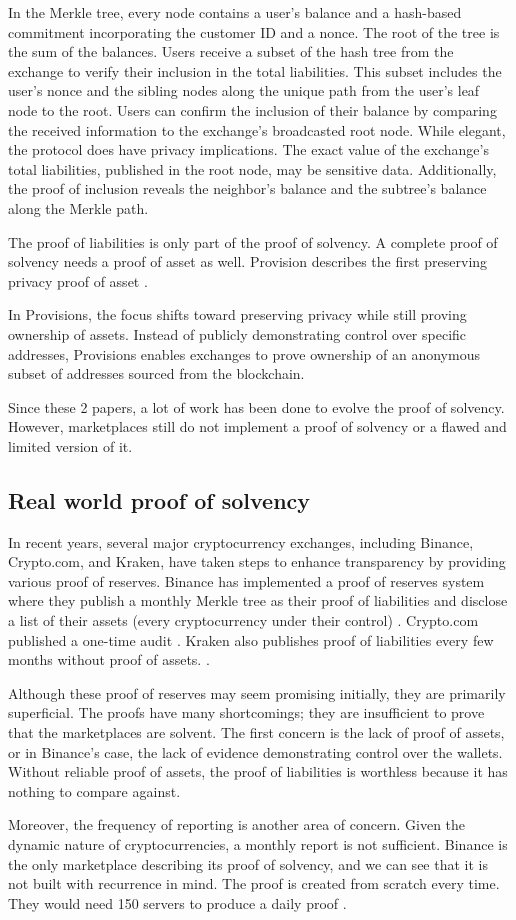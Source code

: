 In the Merkle tree, every node contains a user's balance and a hash-based commitment incorporating the customer ID and a nonce. The root of the tree is the sum of the balances.
Users receive a subset of the hash tree from the exchange to verify their inclusion in the total liabilities. This subset includes the user's nonce and the sibling nodes along the unique path from the user's leaf node to the root.
Users can confirm the inclusion of their balance by comparing the received information to the exchange's broadcasted root node.
While elegant, the protocol does have privacy implications. The exact value of the exchange's total liabilities, published in the root node, may be sensitive data.
Additionally, the proof of inclusion reveals the neighbor's balance and the subtree's balance along the Merkle path.

The proof of liabilities is only part of the proof of solvency. A complete proof of solvency needs a proof of asset as well.
Provision describes the first preserving privacy proof of asset \cite{DBBBCC15}.

In Provisions, the focus shifts toward preserving privacy while still proving ownership of assets.
Instead of publicly demonstrating control over specific addresses, Provisions enables exchanges to prove ownership of an anonymous subset of addresses sourced from the blockchain.

Since these 2 papers, a lot of work has been done to evolve the proof of solvency. However, marketplaces still do not implement a proof of solvency or a flawed and limited version of it.


\subsection{Real world proof of solvency}
In recent years, several major cryptocurrency exchanges, including Binance, Crypto.com, and Kraken, have taken steps to enhance transparency by providing various proof of reserves.
Binance has implemented a proof of reserves system where they publish a monthly Merkle tree as their proof of liabilities and disclose a list of their assets (every cryptocurrency under their control) \cite{BPR}.
Crypto.com published a one-time audit \cite{CC22}.
Kraken also publishes proof of liabilities every few months without proof of assets. \cite{KK23}.

Although these proof of reserves may seem promising initially, they are primarily superficial.
The proofs have many shortcomings; they are insufficient to prove that the marketplaces are solvent.
The first concern is the lack of proof of assets, or in Binance's case, the lack of evidence demonstrating control over the wallets.
Without reliable proof of assets, the proof of liabilities is worthless because it has nothing to compare against.

Moreover, the frequency of reporting is another area of concern. Given the dynamic nature of cryptocurrencies, a monthly report is not sufficient.
Binance is the only marketplace describing its proof of solvency, and we can see that it is not built with recurrence in mind.
The proof is created from scratch every time. They would need 150 servers to produce a daily proof \cite{BPS}.

